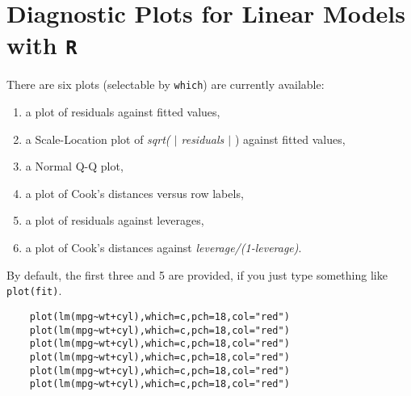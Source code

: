 \documentclass[residuals.tex]{subfiles}
\begin{document}
\Large
\newpage
\section{Diagnostic Plots for Linear Models with \texttt{R}}

There are six plots (selectable by \texttt{which}) are currently available: 
\begin{enumerate}
	\item a plot of residuals against fitted values, 
	\item a Scale-Location plot of \textit{sqrt( $|$ residuals $|$ }) against fitted values, 
	\item a Normal Q-Q plot, 
	\item a plot of Cook's distances versus row labels, 
	\item a plot of residuals against leverages, 
	\item a plot of Cook's distances against \textit{leverage/(1-leverage)}.
\end{enumerate} 

\noindent By default, the first three and 5 are provided, if you just type something like \texttt{plot(fit)}.
\newpage
\begin{framed}
	\begin{verbatim}
	plot(lm(mpg~wt+cyl),which=c,pch=18,col="red")
	plot(lm(mpg~wt+cyl),which=c,pch=18,col="red")
	plot(lm(mpg~wt+cyl),which=c,pch=18,col="red")
	plot(lm(mpg~wt+cyl),which=c,pch=18,col="red")
	plot(lm(mpg~wt+cyl),which=c,pch=18,col="red")
	plot(lm(mpg~wt+cyl),which=c,pch=18,col="red")
	\end{verbatim}
\end{framed}
\end{document}
